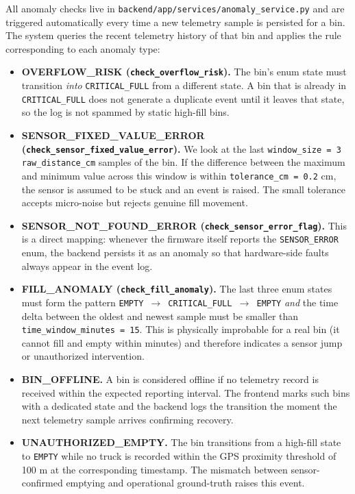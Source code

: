 \documentclass[12pt,a4paper]{report}
\begin{document}
\begin{itemize}[leftmargin=*]
\indent All anomaly checks live in \texttt{backend/app/services/anomaly\_service.py} and are triggered automatically every time a new telemetry sample is persisted for a bin. The system queries the recent telemetry history of that bin and applies the rule corresponding to each anomaly type:

\begin{itemize}[leftmargin=*]
  \item \textbf{OVERFLOW\_RISK (\texttt{check\_overflow\_risk}).} The bin's enum state must transition \textit{into} \texttt{CRITICAL\_FULL} from a different state. A bin that is already in \texttt{CRITICAL\_FULL} does not generate a duplicate event until it leaves that state, so the log is not spammed by static high-fill bins.
  \item \textbf{SENSOR\_FIXED\_VALUE\_ERROR (\texttt{check\_sensor\_fixed\_value\_error}).} We look at the last \texttt{window\_size = 3} \texttt{raw\_distance\_cm} samples of the bin. If the difference between the maximum and minimum value across this window is within \texttt{tolerance\_cm = 0.2} cm, the sensor is assumed to be stuck and an event is raised. The small tolerance accepts micro-noise but rejects genuine fill movement.
  \item \textbf{SENSOR\_NOT\_FOUND\_ERROR (\texttt{check\_sensor\_error\_flag}).} This is a direct mapping: whenever the firmware itself reports the \texttt{SENSOR\_ERROR} enum, the backend persists it as an anomaly so that hardware-side faults always appear in the event log.
  \clearpage
  \item \textbf{FILL\_ANOMALY (\texttt{check\_fill\_anomaly}).} The last three enum states must form the pattern \texttt{EMPTY $\rightarrow$ CRITICAL\_FULL $\rightarrow$ EMPTY} \textit{and} the time delta between the oldest and newest sample must be smaller than \texttt{time\_window\_minutes = 15}. This is physically improbable for a real bin (it cannot fill and empty within minutes) and therefore indicates a sensor jump or unauthorized intervention.
  \item \textbf{BIN\_OFFLINE.} A bin is considered offline if no telemetry record is received within the expected reporting interval. The frontend marks such bins with a dedicated state and the backend logs the transition the moment the next telemetry sample arrives confirming recovery.
  \item \textbf{UNAUTHORIZED\_EMPTY.} The bin transitions from a high-fill state to \texttt{EMPTY} while no truck is recorded within the GPS proximity threshold of 100 m at the corresponding timestamp. The mismatch between sensor-confirmed emptying and operational ground-truth raises this event.
\end{itemize}


\end{itemize}
\end{document}
